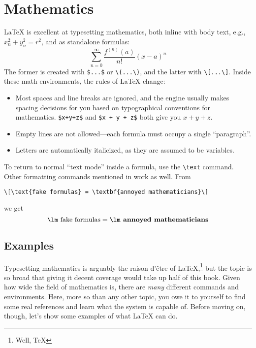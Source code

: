 \chapter{Mathematics}
\label{math}

\LaTeX{} is excellent at typesetting mathematics, both inline with body text,
e.g., $x_n^2+y_n^2=r^2$, and as standalone formulas:
\[\sum_{n=0}^{\infty} \frac{f^{(n)} (a)}{n!} (x - a)^n\]
The former is created with \verb|$...$| or \verb|\(...\)|,
and the latter with \verb|\[...\]|.
Inside these math environments, the rules of \LaTeX{} change:
\begin{itemize}
\item Most spaces and line breaks are ignored,
    and the engine usually makes spacing decisions for you based on
    typographical conventions for mathematics.
    \verb|$x+y+z$| and \verb|$x + y + z$| both give you $x+y+z$.
\item Empty lines are not allowed---each formula must occupy a single
    ``paragraph''\quotekern.
\item Letters are automatically italicized, as they are assumed to be variables.
\end{itemize}
To return to normal ``text mode'' inside a formula, use the \verb|\text| command.
Other formatting commands mentioned in  work as well.
From
\begin{leftfigure}
\begin{lstlisting}
\[\text{fake formulas} = \textbf{annoyed mathematicians}\]
\end{lstlisting}
\end{leftfigure}
we get
\[\text{\lm fake formulas} = \textbf{\lm annoyed mathematicians}\]

\section{Examples}

Typesetting mathematics is arguably the raison d'être of
\LaTeX,\punckern\footnote{Well, \TeX} but the topic is so broad that giving
it decent coverage would take up half of this book.
Given how wide the field of mathematics is,
there are \emph{many} different commands and environments.
Here, more so than any other topic,
you owe it to yourself to find some real references and learn what the system
is capable of.
Before moving on, though, let's show some examples of what \LaTeX{}
can do.
\newpage

